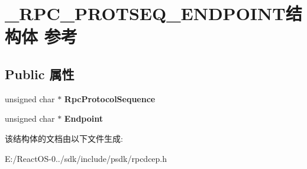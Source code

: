 \hypertarget{struct___r_p_c___p_r_o_t_s_e_q___e_n_d_p_o_i_n_t}{}\section{\+\_\+\+R\+P\+C\+\_\+\+P\+R\+O\+T\+S\+E\+Q\+\_\+\+E\+N\+D\+P\+O\+I\+N\+T结构体 参考}
\label{struct___r_p_c___p_r_o_t_s_e_q___e_n_d_p_o_i_n_t}
\subsection*{Public 属性}
\begin{DoxyCompactItemize}
\item 
\mbox{\label{struct___r_p_c___p_r_o_t_s_e_q___e_n_d_p_o_i_n_t_a3c2a45edaca42d16d69a7eb7297ce6b6}} 
unsigned char $\ast$ {\bfseries Rpc\+Protocol\+Sequence}
\item 
\mbox{\label{struct___r_p_c___p_r_o_t_s_e_q___e_n_d_p_o_i_n_t_a1e4a6097a026a93d46892f354843779b}} 
unsigned char $\ast$ {\bfseries Endpoint}
\end{DoxyCompactItemize}


该结构体的文档由以下文件生成\+:\begin{DoxyCompactItemize}
\item 
E\+:/\+React\+O\+S-\/0../sdk/include/psdk/rpcdcep.\+h\end{DoxyCompactItemize}
